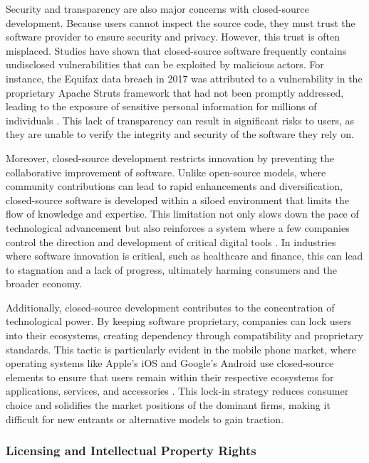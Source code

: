 \begin{refsection}
Security and transparency are also major concerns with closed-source development. Because users cannot inspect the source code, they must trust the software provider to ensure security and privacy. However, this trust is often misplaced. Studies have shown that closed-source software frequently contains undisclosed vulnerabilities that can be exploited by malicious actors. For instance, the Equifax data breach in 2017 was attributed to a vulnerability in the proprietary Apache Struts framework that had not been promptly addressed, leading to the exposure of sensitive personal information for millions of individuals \cite[pp.~120-125]{schneier2018}. This lack of transparency can result in significant risks to users, as they are unable to verify the integrity and security of the software they rely on.

Moreover, closed-source development restricts innovation by preventing the collaborative improvement of software. Unlike open-source models, where community contributions can lead to rapid enhancements and diversification, closed-source software is developed within a siloed environment that limits the flow of knowledge and expertise. This limitation not only slows down the pace of technological advancement but also reinforces a system where a few companies control the direction and development of critical digital tools \cite[pp.~31-37]{benkler2010}. In industries where software innovation is critical, such as healthcare and finance, this can lead to stagnation and a lack of progress, ultimately harming consumers and the broader economy.

Additionally, closed-source development contributes to the concentration of technological power. By keeping software proprietary, companies can lock users into their ecosystems, creating dependency through compatibility and proprietary standards. This tactic is particularly evident in the mobile phone market, where operating systems like Apple’s iOS and Google’s Android use closed-source elements to ensure that users remain within their respective ecosystems for applications, services, and accessories \cite[pp.~58-65]{perens2005}. This lock-in strategy reduces consumer choice and solidifies the market positions of the dominant firms, making it difficult for new entrants or alternative models to gain traction.

\subsubsection{Licensing and Intellectual Property Rights}


\end{refsection}
